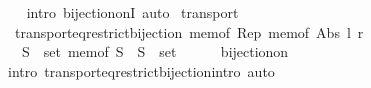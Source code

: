 \begin{isabellebody}
\ \ \isamarkupfalse%
\ {\isacharparenleft}{\kern0pt}intro\ bijection{\isacharunderscore}{\kern0pt}onI{\isacharparenright}{\kern0pt}\ auto%
\endisatagproof
{\isafoldproof}%
%
\isadelimproof
\isanewline
%
\endisadelimproof
\isanewline
{}\isamarkupfalse%
\ transport{\isacharquery}{\kern0pt}\ {\isacharcolon}{\kern0pt}\isanewline
\ \ transport{\isacharunderscore}{\kern0pt}eq{\isacharunderscore}{\kern0pt}restrict{\isacharunderscore}{\kern0pt}bijection\ {\isachardoublequoteopen}mem{\isacharunderscore}{\kern0pt}of\ Rep{\isachardoublequoteclose}\ {\isachardoublequoteopen}mem{\isacharunderscore}{\kern0pt}of\ Abs{\isachardoublequoteclose}\ l\ r\isanewline
\ \ \ {\isachardoublequoteopen}{\isasymAnd}S\ {\isacharcolon}{\kern0pt}{\isacharcolon}{\kern0pt}\ set{\isachardot}{\kern0pt}\ {\isacharparenleft}{\kern0pt}{\isacharequal}{\kern0pt}\isactrlbsub mem{\isacharunderscore}{\kern0pt}of\ S\isactrlesub {\isacharparenright}{\kern0pt}\ {\isasymequiv}\ {\isacharparenleft}{\kern0pt}{\isacharparenleft}{\kern0pt}{\isacharequal}{\kern0pt}\isactrlbsub S\isactrlesub {\isacharparenright}{\kern0pt}\ {\isacharcolon}{\kern0pt}{\isacharcolon}{\kern0pt}\ set\ {\isasymRightarrow}\ {\isacharunderscore}{\kern0pt}{\isacharparenright}{\kern0pt}{\isachardoublequoteclose}\isanewline
%
\isadelimproof
\ \ %
\endisadelimproof
%
\isatagproof
{}\isamarkupfalse%
\ bijection{\isacharunderscore}{\kern0pt}on\ \isamarkupfalse%
\ {\isacharparenleft}{\kern0pt}intro\ transport{\isacharunderscore}{\kern0pt}eq{\isacharunderscore}{\kern0pt}restrict{\isacharunderscore}{\kern0pt}bijection{\isachardot}{\kern0pt}intro{\isacharparenright}{\kern0pt}\ auto%
\endisatagproof
{\isafoldproof}%
%
\isadelimproof
\isanewline
%
\endisadelimproof
\isanewline
{}\isamarkupfalse%
\isanewline
\isanewline
%
\isadelimtheory
\isanewline
%
\endisadelimtheory
%
\isatagtheory
{}\isamarkupfalse%
%
\endisatagtheory
{\isafoldtheory}%
%
\isadelimtheory
%
\endisadelimtheory
%
\end{isabellebody}%
\endinput
